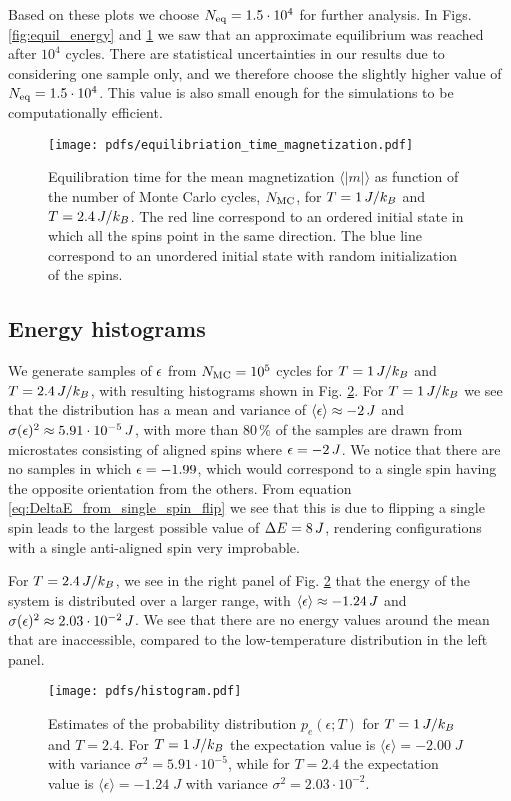 Based on these plots we choose $N_\mathrm{eq}=1.5\cdot10^4$ for further analysis. In Figs. \ref{fig:equil_energy} and \ref{fig:equil_magn} we saw that an approximate equilibrium was reached after $10^4$ cycles. There are statistical uncertainties in our results due to considering one sample only, and we therefore choose the slightly higher value of $N_\mathrm{eq}=1.5\cdot10^4$. This value is also small enough for the simulations to be computationally efficient.

\begin{figure}[!ht]
    \texttt{[image: pdfs/equilibriation\_time\_magnetization.pdf]}
    \caption{Equilibration time for the mean magnetization $\langle \vert m \vert \rangle$ as function of the number of Monte Carlo cycles, $N_\mathrm{MC}$, for $T=1\,J/k_B$ and $T=2.4\,J/k_B$. The red line correspond to an ordered initial state in which all the spins point in the same direction. The blue line correspond to an unordered initial state with random initialization of the spins.}
    \label{fig:equil_magn}
\end{figure}

\subsection{Energy histograms}\label{subsec_results:histogram}
We generate samples of $\epsilon$ from $N_\mathrm{MC}=10^5$ cycles for $T=1\,J/k_B$ and $T=2.4\,J/k_B$, with resulting histograms shown in Fig. \ref{fig:histogram}. For $T=1\,J/k_B$ we see that the distribution has a mean and variance of $\expval{\epsilon}\approx-2\,J$ and $\sigma(\epsilon)^2\approx5.91\cdot10^{-5}\,J$, with more than $80\,\%$ of the samples are drawn from microstates consisting of aligned spins where $\epsilon=-2\,J$. We notice that there are no samples in which $\epsilon=-1.99$, which would correspond to a single spin having the opposite orientation from the others. From equation \eqref{eq:DeltaE_from_single_spin_flip} we see that this is due to flipping a single spin leads to the largest possible value of $\Delta E=8\,J$, rendering configurations with a single anti-aligned spin very improbable.

For $T=2.4\,J/k_B$, we see in the right panel of Fig. \ref{fig:histogram} that the energy of the system is distributed over a larger range, with $\expval{\epsilon}\approx-1.24\,J$ and $\sigma(\epsilon)^2 \approx2.03\cdot10^{-2}\,J$. We see that there are no energy values around the mean that are inaccessible, compared to the low-temperature distribution in the left panel. 
\begin{figure}[!ht]
    \texttt{[image: pdfs/histogram.pdf]}
    \caption{Estimates of the probability distribution $p_e(\epsilon; T)$ for $T=1\,J/k_B$ and $T=2.4$. For $T=1\,J/k_B$ the expectation value is $\langle \epsilon \rangle = -2.00 \; J$ with variance $\sigma^2 = 5.91\cdot 10^{-5}$, while for $T=2.4$ the expectation value is $\langle \epsilon \rangle = -1.24 \; J$ with variance $\sigma^2=2.03\cdot 10^{-2}$.}
    \label{fig:histogram}
\end{figure}

